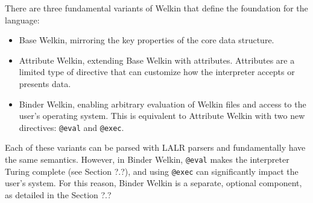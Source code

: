 There are three fundamental variants of Welkin that define the foundation for the language:
\begin{itemize}
	\item Base Welkin, mirroring the key properties of the core data structure.
	\item Attribute Welkin, extending Base Welkin with attributes. Attributes are a limited type of directive that can customize how the interpreter accepts or presents data.
	\item Binder Welkin, enabling arbitrary evaluation of Welkin files and access to the user's operating system. This is equivalent to Attribute Welkin with two new directives: \texttt{@eval} and \texttt{@exec}. \end{itemize}
Each of these variants can be parsed with LALR parsers and fundamentally have the same semantics. However, in Binder Welkin, \texttt{@eval} makes the interpreter Turing complete (see Section ?.?), and using \texttt{@exec} can significantly impact the user's system. For this reason, Binder Welkin is a separate, optional component, as detailed in the Section ?.?
